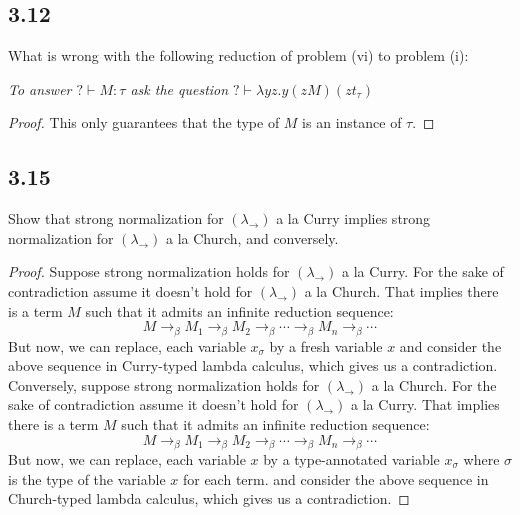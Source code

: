 \documentclass[12pt]{article}
\begin{document}
\subsection*{3.12}
What is wrong with the following reduction of problem (vi) to problem (i):

\textsl{To answer $? \vdash M : \tau$ ask the question $? \vdash \lambda yz.y(zM)(zt_\tau)$} \\

\begin{proof}
This only guarantees that the type of $M$ is an instance of $\tau$.
\end{proof}

\subsection*{3.15}
Show that strong normalization for $(\lambda_\rightarrow)$ a la Curry implies strong normalization for $(\lambda_\rightarrow)$ a la Church, and conversely. 

\begin{proof}
Suppose strong normalization holds for $(\lambda_{\rightarrow})$ a la Curry. For the sake of contradiction assume it doesn't hold for $(\lambda_{\rightarrow})$ a la Church. That implies there is a term $M$ such that it admits an infinite reduction sequence:
$$M \rightarrow_\beta M_1 \rightarrow_\beta M_2 \rightarrow_\beta \cdots \rightarrow_\beta M_n \rightarrow_\beta \cdots$$
But now, we can replace, each variable $x_\sigma$ by a fresh variable $x$ and consider the above sequence in Curry-typed lambda calculus, which gives us a contradiction. \\

Conversely, suppose strong normalization holds for $(\lambda_{\rightarrow})$ a la Church. For the sake of contradiction assume it doesn't hold for $(\lambda_{\rightarrow})$ a la Curry. That implies there is a term $M$ such that it admits an infinite reduction sequence:
$$M \rightarrow_\beta M_1 \rightarrow_\beta M_2 \rightarrow_\beta \cdots \rightarrow_\beta M_n \rightarrow_\beta \cdots$$
But now, we can replace, each variable $x$ by a type-annotated variable $x_\sigma$ where $\sigma$ is the type of the variable $x$ for each term. and consider the above sequence in Church-typed lambda calculus, which gives us a contradiction.
\end{proof}

\vspace{1in} %
\end{document}
